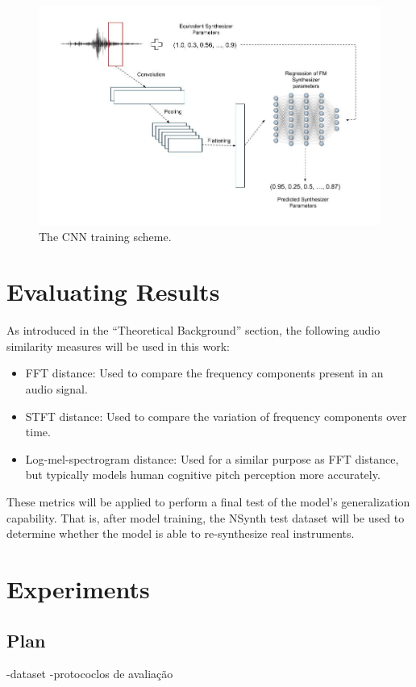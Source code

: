 \documentclass[sigconf,natbib=false]{acmart}
\begin{document}
\begin{figure}[h]
 \centering
 \includegraphics[width=\linewidth]{figs/cnn_simple_training.jpg}
 \caption{The CNN training scheme.}
\end{figure}

\section{Evaluating Results}

As introduced in the ``Theoretical Background'' section, the following audio similarity measures will be used in this work:

\begin{itemize}
\item FFT distance: Used to compare the frequency components present in an audio signal.
\item STFT distance: Used to compare the variation of frequency components over time.
\item Log-mel-spectrogram distance: Used for a similar purpose as FFT distance, but typically models human cognitive pitch perception more accurately.
\end{itemize}

These metrics will be applied to perform a final test of the model's generalization capability. That is, after model training, the NSynth test dataset will be used to determine whether the model is able to re-synthesize real instruments.


\section{Experiments}
\subsection{Plan}
-dataset
-protococlos de avaliação
\end{document}
